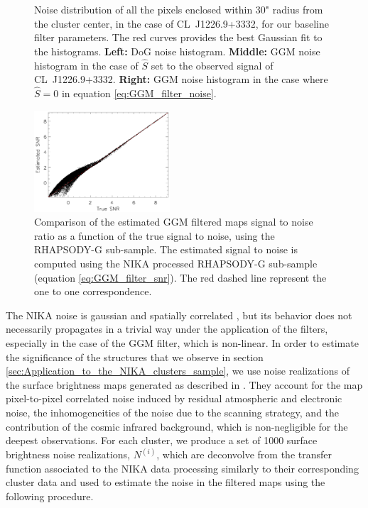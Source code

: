 \documentclass[twocolumn,traditabstract]{aa}
\begin{document}
\begin{figure}[h]
\caption{\footnotesize{Noise distribution of all the pixels enclosed within 30" radius from the cluster center, in the case of \mbox{CL~J1226.9+3332}, for our baseline filter parameters. The red curves provides the best Gaussian fit to the histograms. {\bf Left:} DoG noise histogram. {\bf Middle:} GGM noise histogram in the case of $\hat{S}$ set to the observed signal of \mbox{CL~J1226.9+3332}. {\bf Right:} GGM noise histogram in the case where $\hat{S} = 0$ in equation \ref{eq:GGM_filter_noise}.}}
\label{fig:noise_statistics1}
\end{figure}

\begin{figure}[h]
\centering
\includegraphics[width=0.45\textwidth]{Figure/Conta_noise_Grad_SNRtrueVSmeasRG377_00181_Ymap_zobs0p5_15_15_45.pdf}
\caption{\footnotesize{Comparison of the estimated GGM filtered maps signal to noise ratio as a function of the true signal to noise, using the RHAPSODY-G sub-sample. The estimated signal to noise is computed using the NIKA processed RHAPSODY-G sub-sample (equation \ref{eq:GGM_filter_snr}). The red dashed line represent the one to one correspondence.}}
\label{fig:noise_statistics2}
\end{figure}

The NIKA noise is gaussian and spatially correlated \citep{Adam2016a}, but its behavior does not necessarily propagates in a trivial way under the application of the filters, especially in the case of the GGM filter, which is non-linear. In order to estimate the significance of the structures that we observe in section \ref{sec:Application_to_the_NIKA_clusters_sample}, we use noise realizations of the surface brightness maps generated as described in \cite{Adam2016a}. They account for the map pixel-to-pixel correlated noise induced by residual atmospheric and electronic noise, the inhomogeneities of the noise due to the scanning strategy, and the contribution of the cosmic infrared background, which is non-negligible for the deepest observations. For each cluster, we produce a set of 1000 surface brightness noise realizations, $N^{(i)}$, which are deconvolve from the transfer function associated to the NIKA data processing similarly to their corresponding cluster data and used to estimate the noise in the filtered maps using the following procedure. 
\end{document}
